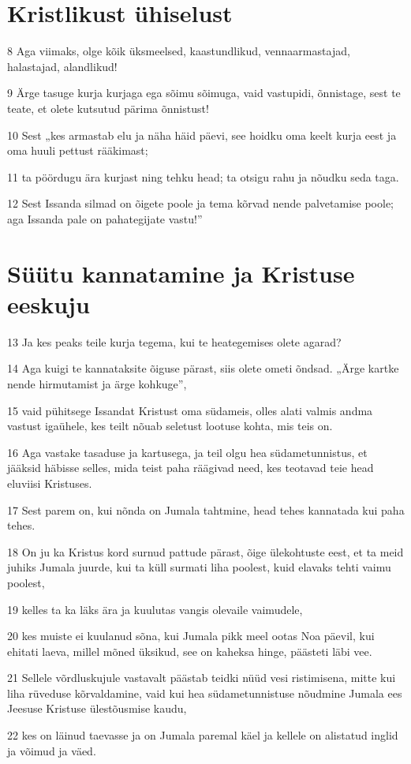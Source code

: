 \section*{Kristlikust ühiselust}

\par 8 Aga viimaks, olge kõik üksmeelsed, kaastundlikud, vennaarmastajad, halastajad, alandlikud!
\par 9 Ärge tasuge kurja kurjaga ega sõimu sõimuga, vaid vastupidi, õnnistage, sest te teate, et olete kutsutud pärima õnnistust!
\par 10 Sest „kes armastab elu ja näha häid päevi, see hoidku oma keelt kurja eest ja oma huuli pettust rääkimast;
\par 11 ta pöördugu ära kurjast ning tehku head; ta otsigu rahu ja nõudku seda taga.
\par 12 Sest Issanda silmad on õigete poole ja tema kõrvad nende palvetamise poole; aga Issanda pale on pahategijate vastu!”

\section*{Süütu kannatamine ja Kristuse eeskuju}

\par 13 Ja kes peaks teile kurja tegema, kui te heategemises olete agarad?
\par 14 Aga kuigi te kannataksite õiguse pärast, siis olete ometi õndsad. „Ärge kartke nende hirmutamist ja ärge kohkuge”,
\par 15 vaid pühitsege Issandat Kristust oma südameis, olles alati valmis andma vastust igaühele, kes teilt nõuab seletust lootuse kohta, mis teis on.
\par 16 Aga vastake tasaduse ja kartusega, ja teil olgu hea südametunnistus, et jääksid häbisse selles, mida teist paha räägivad need, kes teotavad teie head eluviisi Kristuses.
\par 17 Sest parem on, kui nõnda on Jumala tahtmine, head tehes kannatada kui paha tehes.
\par 18 On ju ka Kristus kord surnud pattude pärast, õige ülekohtuste eest, et ta meid juhiks Jumala juurde, kui ta küll surmati liha poolest, kuid elavaks tehti vaimu poolest,
\par 19 kelles ta ka läks ära ja kuulutas vangis olevaile vaimudele,
\par 20 kes muiste ei kuulanud sõna, kui Jumala pikk meel ootas Noa päevil, kui ehitati laeva, millel mõned üksikud, see on kaheksa hinge, päästeti läbi vee.
\par 21 Sellele võrdluskujule vastavalt päästab teidki nüüd vesi ristimisena, mitte kui liha rüveduse kõrvaldamine, vaid kui hea südametunnistuse nõudmine Jumala ees Jeesuse Kristuse ülestõusmise kaudu,
\par 22 kes on läinud taevasse ja on Jumala paremal käel ja kellele on alistatud inglid ja võimud ja väed.



